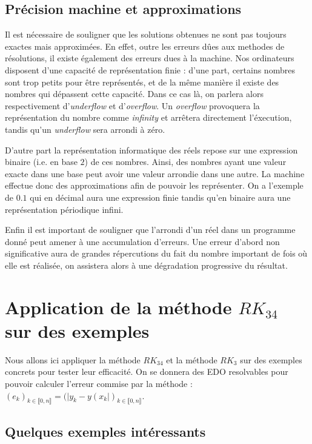 \documentclass[a4paper, titlepage]{livret} %
\begin{document}
		\section{Précision machine et approximations}
			Il est nécessaire de souligner que les solutions obtenues ne sont pas toujours exactes mais approximées. 
			En effet, outre les erreurs dûes aux methodes de résolutions, il existe également des erreurs dues à la machine.
			Nos ordinateurs disposent d'une capacité de représentation finie : d'une part, certains nombres sont trop petits pour être représentés, et de la même manière il existe des nombres qui dépassent cette capacité. 
			Dans ce cas là, on parlera alors respectivement d'\emph{underflow} et d'\emph{overflow}. 
			Un \emph{overflow} provoquera la représentation du nombre comme \emph{infinity} et arrêtera directement l'éxecution, tandis qu'un \emph{underflow} sera arrondi à zéro.
			
			D'autre part la représentation informatique des réels repose sur une expression binaire (i.e. en base $2$) de ces nombres.
			Ainsi, des nombres ayant une valeur exacte dans une base peut avoir une valeur arrondie dans une autre. 
			La machine effectue donc des approximations afin de pouvoir les représenter. 
			On a l'exemple de $0.1$ qui en décimal aura une expression finie tandis qu'en binaire aura une représentation périodique infini.
			
			Enfin il est important de souligner que l'arrondi d'un réel dans un programme donné peut amener à une accumulation d'erreurs. 
			Une erreur d'abord non significative aura de grandes répercutions du fait du nombre important de fois où elle est réalisée, on assistera alors à une dégradation progressive du résultat.

	\chapter{Application de la méthode $RK_{34}$ sur des exemples}
		Nous allons ici appliquer la méthode $RK_{34}$ et la méthode $RK_{3}$ sur des exemples concrets pour tester leur efficacité.
		On se donnera des EDO resolvables pour pouvoir calculer l'erreur commise par la méthode : $(e_{k})_{k \in \llbracket 0,n \rrbracket} = (|y_{k} - y(x_{k}|)_{k \in \llbracket 0,n \rrbracket}$.
	
		\section{Quelques exemples intéressants}
\end{document}
